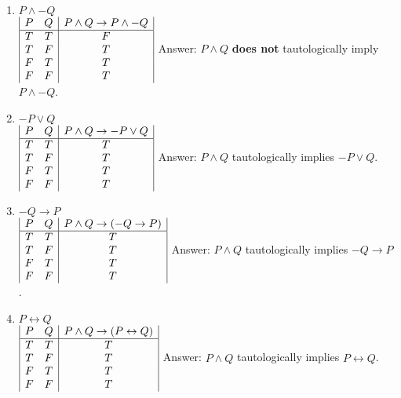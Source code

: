 \documentclass{article}
\begin{document}
\begin{enumerate}[label=(\alph*)]
\item \(P \land -Q\)\\
\(
\begin{array}{|c c|c|}
P & Q & P \land Q \rightarrow P \land -Q\\ 
\hline
T & T & F\\
T & F & T\\
F & T & T\\
F & F & T\\
\end{array}
\)
\singlespace
Answer: \(P \land Q \) \textbf{does not} tautologically imply \(P \land -Q\).\\
\medskip

\item \(-P \lor Q\)\\
\(
\begin{array}{|c c|c|}
P & Q & P \land Q \rightarrow -P \lor Q\\ 
\hline
T & T & T\\
T & F & T\\
F & T & T\\
F & F & T\\
\end{array}
\)
\singlespace
Answer: \(P \land Q \) tautologically implies \(-P \lor Q\).\\
\medskip

\item \(-Q \rightarrow P\)\\
\(
\begin{array}{|c c|c|}
P & Q & P \land Q \rightarrow (-Q \rightarrow P)\\ 
\hline
T & T & T\\
T & F & T\\
F & T & T\\
F & F & T\\
\end{array}
\)
\singlespace
Answer: \(P \land Q \) tautologically implies \(-Q \rightarrow P\).\\
\medskip

\item \(P \leftrightarrow Q\)\\
\(
\begin{array}{|c c|c|}
P & Q & P \land Q \rightarrow (P \leftrightarrow Q)\\ 
\hline
T & T & T\\
T & F & T\\
F & T & T\\
F & F & T\\
\end{array}
\)
\singlespace
Answer: \(P \land Q \) tautologically implies \(P \leftrightarrow Q\).\\
\medskip
\end{enumerate}
\end{document}
